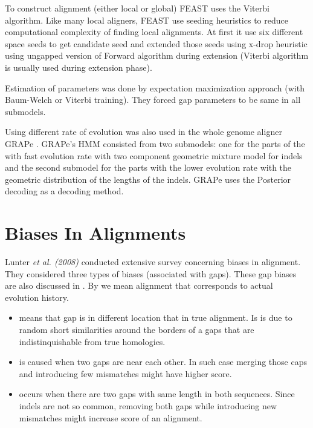 To construct alignment (either local or global) FEAST uses the Viterbi
algorithm. Like many local aligners, FEAST use seeding heuristics to reduce
computational complexity of finding local alignments.  At first it use six
different space seeds to get candidate seed and extended those seeds using
x-drop heuristic \cite{Altschul1997} using ungapped version of Forward algorithm
during extension (Viterbi algorithm is usually used during extension phase).

Estimation of parameters was done by expectation maximization approach (with
Baum-Welch or Viterbi training). They forced gap parameters to be same in all
submodels.

Using different rate of evolution was also used  in the whole genome aligner
GRAPe \cite{Satija2010}. GRAPe's HMM  consisted from two submodels: one for the
parts of the with fast evolution rate with two component geometric mixture model
for indels and the second submodel for the parts with the lower evolution rate
with the geometric distribution of the lengths of the indels. GRAPe uses the
Posterior decoding as a decoding method.


\section{Biases In Alignments}
\label{SECTION:BIASES}
Lunter {\it et al. (2008)} conducted extensive survey concerning biases in
alignment. They considered three types of biases (associated with gaps). These
gap biases are also discussed in \cite{Durbin1998} . By
 we mean alignment that corresponds to actual 
evolution history.
\begin{itemize}

\item {} means that gap is in different location that in
true alignment. Is is due to random short similarities around the borders of
a gaps that are indistinquishable from true homologies.

\item {} is caused when two gaps are near each other.
In such case merging those caps and introducing few mismatches might have higher
score. 

\item {} occurs when there are two gaps with
same length in both sequences. Since indels are not so common, removing both
gaps while introducing new mismatches might increase score of an alignment.

\end{itemize}

